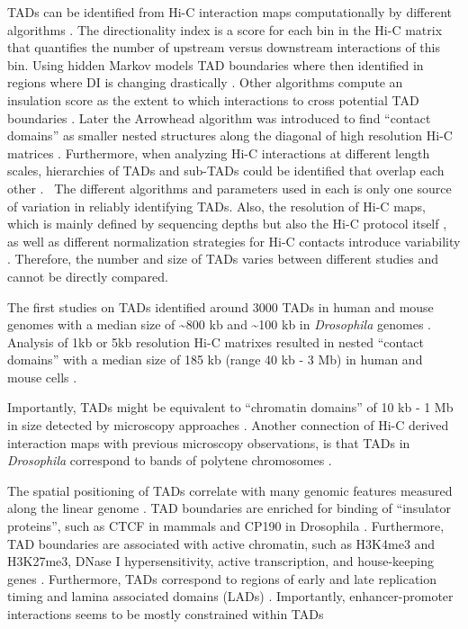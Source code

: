 \documentclass[a4paper,twoside=true,openright,parskip=full,chapterprefix=true,11pt,headings=normal,bibliography=totoc,listof=totoc,titlepage=on,captions=tableabove,draft=false]{scrreprt}
\theoremstyle{definition}
\theoremstyle{definition}
\theoremstyle{definition}
\theoremstyle{remark}
\begin{document}
TADs can be identified from Hi-C interaction maps computationally by
different algorithms \citep{Ay2015}. The directionality index is a score
for each bin in the Hi-C matrix that quantifies the number of upstream
versus downstream interactions of this bin. Using hidden Markov models
TAD boundaries where then identified in regions where DI is changing
drastically \citep{Dixon2012}. Other algorithms compute an insulation
score as the extent to which interactions to cross potential TAD
boundaries \citep{Crane2015}. Later the Arrowhead algorithm was
introduced to find ``contact domains'' as smaller nested structures
along the diagonal of high resolution Hi-C matrices \citep{Rao2014}.
Furthermore, when analyzing Hi-C interactions at different length
scales, hierarchies of TADs and sub-TADs could be identified that
overlap each other \citep[\citet{Fraser2015}]{Filippova2014}.~ The
different algorithms and parameters used in each is only one source of
variation in reliably identifying TADs. Also, the resolution of Hi-C
maps, which is mainly defined by sequencing depths but also the Hi-C
protocol itself \citep{Rao2014}, as well as different normalization
strategies for Hi-C contacts introduce variability \citep{Forcato2017}.
Therefore, the number and size of TADs varies between different studies
and cannot be directly compared.

The first studies on TADs identified around 3000 TADs in human and mouse
genomes with a median size of \textasciitilde{}800 kb \citep{Dixon2012}
and \textasciitilde{}100 kb in \emph{Drosophila} genomes
\citep{Sexton2012}. Analysis of 1kb or 5kb resolution Hi-C matrixes
resulted in nested ``contact domains'' with a median size of 185 kb
(range 40 kb - 3 Mb) in human and mouse cells \citep{Rao2014}.

Importantly, TADs might be equivalent to ``chromatin domains'' of 10 kb
- 1 Mb in size detected by microscopy approaches
\citep{Cremer2010, Gibcus2013}. Another connection of Hi-C derived
interaction maps with previous microscopy observations, is that TADs in
\emph{Drosophila} correspond to bands of polytene chromosomes
\citep{Eagen2015}.

The spatial positioning of TADs correlate with many genomic features
measured along the linear genome \citep{Merkenschlager2016}. TAD
boundaries are enriched for binding of ``insulator proteins'', such as
CTCF in mammals and CP190 in Drosophila \citep{Dixon2012, Sexton2012}.
Furthermore, TAD boundaries are associated with active chromatin, such
as H3K4me3 and H3K27me3, DNase I hypersensitivity, active transcription,
and house-keeping genes \citep{Dixon2012}. Furthermore, TADs correspond
to regions of early and late replication timing
\citep{Pope2014, Dileep2015} and lamina associated domains (LADs)
\citep{Dixon2012}. Importantly, enhancer-promoter interactions seems to
be mostly constrained within TADs \citep{Shen2012}
\end{document}
